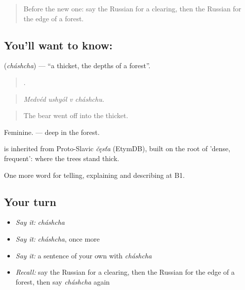 \label{lesson:RU-C461-chashcha}



\begin{quote}
Before the new one: say the Russian for a clearing, then the Russian for the edge of a forest.
\end{quote}

\subsection*{You'll want to know: }
\textbf{} (\emph{cháshcha}) — \textquotedblleft{}a thicket, the depths of a forest\textquotedblright{}.

\begin{quote}
   .
\end{quote}

\begin{quote}
\emph{Medvéd ushyól v cháshchu.}
\end{quote}

\begin{quote}
The bear went off into the thicket.
\end{quote}

Feminine. \emph{  } — deep in the forest.

\begin{cousinweb}
\emph{} is inherited from Proto-Slavic \emph{čęsťa} (EtymDB), built on the root of \emph{} 'dense, frequent': where the trees stand thick.
\end{cousinweb}

\begin{grammarlens}[title={What you've built}]
One more word for telling, explaining and describing at B1.
\end{grammarlens}

\subsection*{Your turn}
\begin{itemize}
\raggedright
  \item \emph{Say it:} \emph{cháshcha}
  \item \emph{Say it:} \emph{cháshcha}, once more
  \item \emph{Say it:} a sentence of your own with \emph{cháshcha}
  \item \emph{Recall:} say the Russian for a clearing, then the Russian for the edge of a forest, then say \emph{cháshcha} again
\end{itemize}


